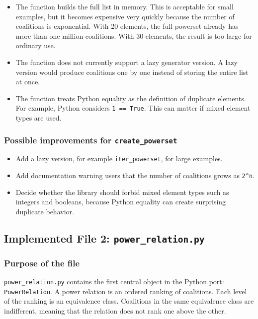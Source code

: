 \documentclass[11pt]{article}
\begin{document}
\begin{itemize}
  \item The function builds the full list in memory. This is acceptable for
  small examples, but it becomes expensive very quickly because the number of
  coalitions is exponential. With 20 elements, the full powerset already has more than one million
  coalitions. With 30 elements, the result is too large for ordinary use.
  \item The function does not currently support a lazy generator version. A
  lazy version would produce coalitions one by one instead of storing the
  entire list at once.
  \item The function treats Python equality as the definition of duplicate
  elements. For example, Python considers \texttt{1 == True}. This can matter
  if mixed element types are used.
\end{itemize}

\subsubsection*{Possible improvements for \texttt{create\_powerset}}

\begin{itemize}
  \item Add a lazy version, for example \texttt{iter\_powerset}, for large
  examples.
  \item Add documentation warning users that the number of coalitions grows as
  \texttt{2\^{}n}.
  \item Decide whether the library should forbid mixed element types such as
  integers and booleans, because Python equality can create surprising
  duplicate behavior.
\end{itemize}

\subsection{Implemented File 2: \texttt{power\_relation.py}}

\subsubsection*{Purpose of the file}

\texttt{power\_relation.py} contains the first central object in the Python
port: \texttt{PowerRelation}. A power relation is an ordered ranking of
coalitions. Each level of the ranking is an equivalence class. Coalitions in
the same equivalence class are indifferent, meaning that the relation does not
rank one above the other.
\end{document}
